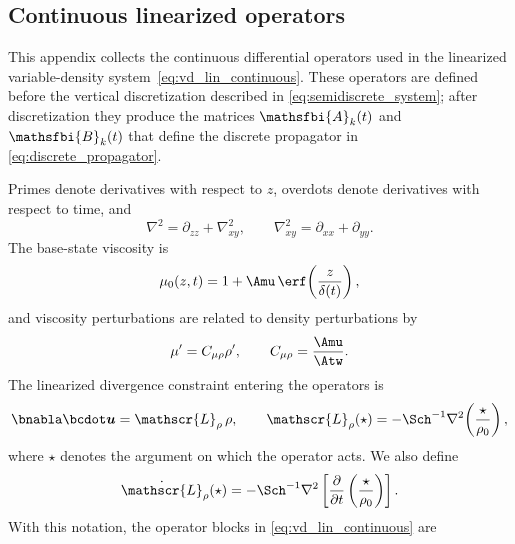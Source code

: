 \clearpage
\begin{appendices}

\section{Continuous linearized operators}
\label{app:operators}

This appendix collects the continuous differential operators used in the linearized
variable-density system~\eqref{eq:vd_lin_continuous}. These operators are defined
before the vertical discretization described in \eqref{eq:semidiscrete_system}; after
discretization they produce the matrices \(\mathsfbi{A}_{k}(t)\) and \(\mathsfbi{B}_{k}(t)\) that
define the discrete propagator in \eqref{eq:discrete_propagator}.

Primes denote derivatives with respect to \(z\), overdots denote derivatives with respect to time,
and
\begin{equation}
  \nabla^2=\partial_{zz}+\nabla_{xy}^2,
  \qquad
  \nabla_{xy}^2=\partial_{xx}+\partial_{yy}.
  \label{eq:appendix_laplacian_definitions}
\end{equation}
The base-state viscosity is
\begin{equation}
  \mu_0(z,t)
  =
  1+\Amu\,\erf\!\left(\frac{z}{\delta(t)}\right),
  \label{eq:appendix_base_viscosity}
\end{equation}
and viscosity perturbations are related to density perturbations by
\begin{equation}
  \mu' = C_{\mu\rho}\rho',
  \qquad
  C_{\mu\rho}=\frac{\Amu}{\Atw}.
  \label{eq:appendix_viscosity_density_coupling}
\end{equation}
The linearized divergence constraint entering the operators is
\begin{equation}
  \bnabla\bcdot\boldsymbol{u}
  =
  \mathscr{L}_{\rho}\,\rho,
  \qquad
  \mathscr{L}_{\rho}(\star)
  =
  -\Sch^{-1}\nabla^2\!\left(\frac{\star}{\rho_0}\right),
  \label{eq:linearized_divergence}
\end{equation}
where \(\star\) denotes the argument on which the operator acts. We also define
\begin{equation}
  \dot{\mathscr{L}}_{\rho}(\star)
  =
  -\Sch^{-1}
  \nabla^2
  \left[
    \frac{\partial}{\partial t}
    \left(
      \frac{\star}{\rho_0}
    \right)
  \right].
  \label{eq:ldot_rho}
\end{equation}
With this notation, the operator blocks in \eqref{eq:vd_lin_continuous} are
\begin{subequations}

\end{subequations}
\end{appendices}
